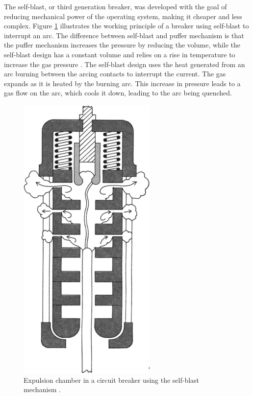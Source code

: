 \documentclass[10pt,b5paper,twoside]{article}
\begin{document}
The self-blast, or third generation breaker, was developed with the goal of reducing mechanical power of the operating system, making it cheaper and less complex. Figure \ref{fig:selfBlast} illustrates the working principle of a breaker using self-blast to interrupt an arc. The difference between self-blast and puffer mechanism is that the puffer mechanism increases the pressure by reducing the volume, while the self-blast design has a constant volume and relies on a rise in temperature to increase the gas pressure \cite{bib:CBAC}. The self-blast design uses the heat generated from an arc burning between the arcing contacts to interrupt the current. The gas expands as it is heated by the burning arc. This increase in pressure leads to a gas flow on the arc, which cools it down, leading to the arc being quenched.

\begin{figure} [H]
\centering
\includegraphics[scale=0.33]{Bilder/Theory/selfBlast.png}
\caption{Expulsion chamber in a circuit breaker using the self-blast mechanism \cite{bib:CBAC}.} \label{fig:selfBlast}
\end{figure}
\end{document}
